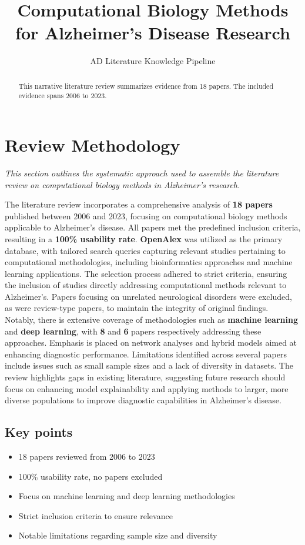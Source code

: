 \documentclass{MITcsail}
\title{Computational Biology Methods for Alzheimer's Disease Research}
\author{AD Literature Knowledge Pipeline\\
\vspace{1em}
\normalfont{\small Automated narrative literature review}}
\begin{document}
\maketitle
\thispagestyle{firstpagestyle}

\begin{abstract}
This narrative literature review summarizes evidence from 18 papers. The included evidence spans 2006 to 2023.
\end{abstract}

\section{Review Methodology}

\textit{This section outlines the systematic approach used to assemble the literature review on computational biology methods in Alzheimer's research.}

The literature review incorporates a comprehensive analysis of \textbf{18 papers} published between 2006 and 2023, focusing on computational biology methods applicable to Alzheimer's disease. All papers met the predefined inclusion criteria, resulting in a \textbf{100\% usability rate}. \textbf{OpenAlex} was utilized as the primary database, with tailored search queries capturing relevant studies pertaining to computational methodologies, including bioinformatics approaches and machine learning applications. The selection process adhered to strict criteria, ensuring the inclusion of studies directly addressing computational methods relevant to Alzheimer's. Papers focusing on unrelated neurological disorders were excluded, as were review-type papers, to maintain the integrity of original findings. Notably, there is extensive coverage of methodologies such as \textbf{machine learning} and \textbf{deep learning}, with \textbf{8} and \textbf{6} papers respectively addressing these approaches. Emphasis is placed on network analyses and hybrid models aimed at enhancing diagnostic performance. Limitations identified across several papers include issues such as small sample sizes and a lack of diversity in datasets. The review highlights gaps in existing literature, suggesting future research should focus on enhancing model explainability and applying methods to larger, more diverse populations to improve diagnostic capabilities in Alzheimer's disease.

\subsection*{Key points}
\begin{itemize}
  \item 18 papers reviewed from 2006 to 2023
  \item 100\% usability rate, no papers excluded
  \item Focus on machine learning and deep learning methodologies
  \item Strict inclusion criteria to ensure relevance
  \item Notable limitations regarding sample size and diversity
\end{itemize}
\end{document}
